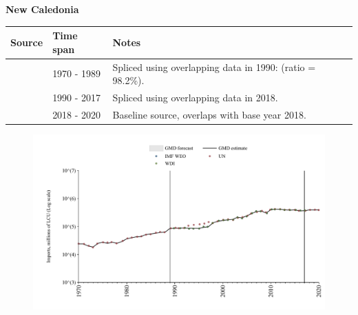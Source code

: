 \documentclass[12pt,a4paper,landscape]{article}
\begin{document}
\begin{adjustbox}{max totalsize={\paperwidth}{\paperheight},center}
\begin{minipage}[t][\textheight][t]{\textwidth}
\vspace*{0.5cm}
{}
\begin{center}
{\Large\bfseries New Caledonia}
\end{center}
\vspace{0.5cm}
\begin{table}[H]
\centering
\small
\begin{tabular}{|l|l|l|}
\hline
\textbf{Source} & \textbf{Time span} & \textbf{Notes} \\
\hline
\rowcolor{white}\cite{UN}& 1970 - 1989 &Spliced using overlapping data in 1990: (ratio = 98.2\%).\\
\rowcolor{lightgray}\cite{WDI}& 1990 - 2017 &Spliced using overlapping data in 2018.\\
\rowcolor{white}\cite{UN}& 2018 - 2020 &Baseline source, overlaps with base year 2018.\\
\hline
\end{tabular}
\end{table}
\begin{figure}[H]
\centering
\includegraphics[width=\textwidth,height=0.6\textheight,keepaspectratio]{graphs/NCL_imports.pdf}
\end{figure}
\end{minipage}
\end{adjustbox}
\end{document}
